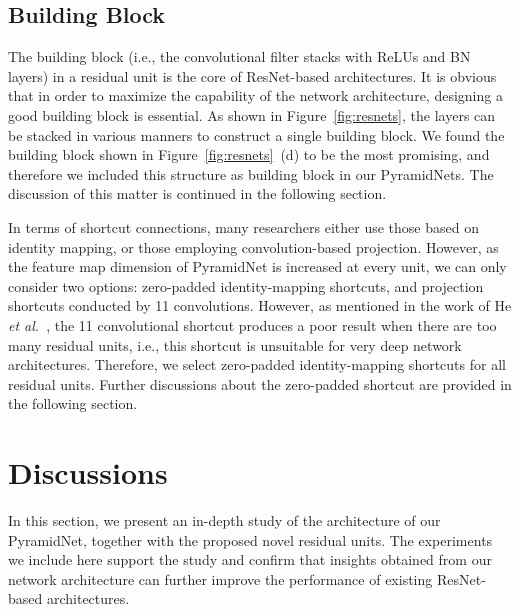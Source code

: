 \documentclass[10pt,twocolumn,letterpaper]{article}
\begin{document}
\subsection{Building Block}
The building block (i.e., the convolutional filter stacks with ReLUs and BN layers) in a residual unit is the core of ResNet-based architectures. It is obvious that in order to maximize the capability of the network architecture, designing a good building block is essential. As shown in Figure~\ref{fig:resnets}, the layers can be stacked in various manners to construct a single building block. We found the building block shown in Figure~\ref{fig:resnets}~(d) to be the most promising, and therefore we included this structure as building block in our PyramidNets. The discussion of this matter is continued in the following section.

In terms of shortcut connections, many researchers either use those based on identity mapping, or those employing convolution-based projection. However, as the feature map dimension of PyramidNet is increased at every unit, we can only consider two options: zero-padded identity-mapping shortcuts, and projection shortcuts conducted by 11 convolutions. However, as mentioned in the work of He {\it et al.}~\cite{preresnet}, the 11 convolutional shortcut produces a poor result when there are too many residual units, i.e., this shortcut is unsuitable for very deep network architectures. Therefore, we select zero-padded identity-mapping shortcuts for all residual units. Further discussions about the zero-padded shortcut are provided in the following section.


\section{Discussions}
\label{sec:discussions}
In this section, we present an in-depth study of the architecture of our PyramidNet, together with the proposed novel residual units. The experiments we include here support the study and confirm that insights obtained from our network architecture can further improve the performance of existing ResNet-based architectures.
\end{document}
